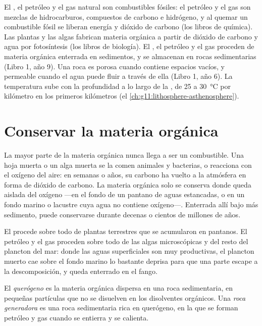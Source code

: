\begin{recall}
El , el petróleo y el gas natural son combustibles fósiles: el petróleo
y el gas son mezclas de hidrocarburos, compuestos de carbono e hidrógeno, y al
quemar un combustible fósil se liberan energía y dióxido de carbono (los
libros de química). Las plantas y las algas fabrican materia orgánica a partir
de dióxido de carbono y agua por fotosíntesis (los libros de biología). El
, el petróleo y el gas proceden de materia orgánica enterrada en
sedimentos, y se almacenan en rocas sedimentarias (Libro 1, año 9). Una roca
es porosa cuando contiene espacios vacíos, y permeable cuando el agua puede
fluir a través de ella (Libro 1, año 6). La temperatura sube con la
profundidad a lo largo de la , de 25 a \qty{30}{\degreeCelsius} por
kilómetro en los primeros kilómetros (el \cref{ch:g11:lithosphere-asthenosphere}).
\end{recall}

\section{Conservar la materia orgánica}

La mayor parte de la materia orgánica nunca llega a ser un combustible. Una
hoja muerta o un alga muerta se la comen animales y bacterias, o reacciona con
el oxígeno del aire: en semanas o años, su carbono ha vuelto a la atmósfera en
forma de dióxido de carbono. La materia orgánica solo se conserva donde queda
aislada del oxígeno ---en el fondo de un pantano de aguas estancadas, o en un
fondo marino o lacustre cuya agua no contiene oxígeno---. Enterrada allí bajo
más sedimento, puede conservarse durante decenas o cientos de millones de años.

El  procede sobre todo de plantas terrestres que se acumularon en
pantanos. El petróleo y el gas proceden sobre todo de las algas microscópicas
y del resto del plancton del mar: donde las aguas superficiales son muy
productivas, el plancton muerto cae sobre el fondo marino lo bastante deprisa
para que una parte escape a la descomposición, y queda enterrado en el fango.

\begin{definition}\label{def:g11:fossil-fuel-geology:source-rock}
El \emph{querógeno} es la materia orgánica dispersa en una
roca sedimentaria, en pequeñas partículas que no se disuelven en los
disolventes orgánicos. Una \emph{roca generadora} es una
roca sedimentaria rica en querógeno, en la que se forman petróleo y gas cuando
se entierra y se calienta.
\end{definition}

